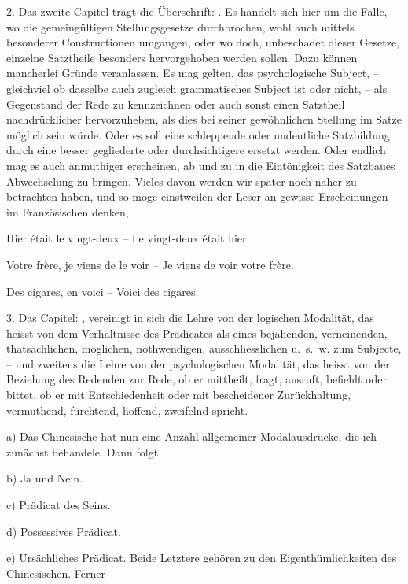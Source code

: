 2. Das zweite Capitel trägt die Überschrift: . Es handelt sich hier um die Fälle, wo die gemeingültigen Stellungsgesetze durchbrochen, wohl auch mittels besonderer Constructionen umgangen, oder wo doch, unbeschadet dieser Gesetze, einzelne Satztheile besonders hervorgehoben werden sollen. Dazu \label{fp.107} können mancherlei Gründe veranlassen. Es mag gelten, das psychologische Subject, – gleichviel ob dasselbe auch zu\label{sp.103}gleich grammatisches Subject ist oder nicht, – als Gegenstand der Rede zu kennzeichnen oder auch sonst einen Satztheil nachdrücklicher hervorzuheben, als dies bei seiner gewöhnlichen Stellung im Satze möglich sein würde. Oder es soll eine schleppende oder undeutliche Satzbildung durch eine besser gegliederte oder durchsichtigere ersetzt werden. Oder endlich mag es auch anmuthiger erscheinen, ab und zu in die Eintönigkeit des Satzbaues Abwechselung zu bringen. Vieles davon werden wir später noch näher zu betrachten haben, und so möge einstweilen der Leser an gewisse Erscheinungen im Französischen denken, 

Hier était le vingt-deux – Le vingt-deux était hier.

Votre frère, je viens de le voir – Je viens de voir votre frère.

Des cigares, en voici – Voici des cigares.

3. Das Capitel: ,  vereinigt in sich die Lehre von der logischen Modalität, das heisst von dem Verhältnisse des Prädicates als eines bejahenden, verneinenden, thatsächlichen, möglichen, nothwendigen, ausschliesslichen u.~s.~w. zum Subjecte, – und zweitens die Lehre von der psychologischen Modalität, das heisst von der Beziehung des Redenden zur Rede, ob er mittheilt, fragt, ausruft, befiehlt oder bittet, ob er mit Entschiedenheit oder mit bescheidener Zurückhaltung, vermuthend, fürchtend, hoffend, zweifelnd spricht.

a) Das Chinesische hat nun eine Anzahl allgemeiner Modalausdrücke, die ich zunächst behandele. Dann folgt

b) Ja und Nein.

c) Prädicat des Seins.

d) Possessives Prädicat. 

e) Ursächliches Prädicat. Beide Letztere gehören zu den Eigenthümlichkeiten des Chinesischen. Ferner

